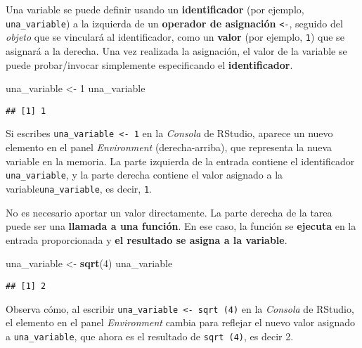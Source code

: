 \documentclass[
]{book}
\newenvironment{Shaded}{\begin{snugshade}}{\end{snugshade}}
\newcommand{\DecValTok}[1]{\textcolor[rgb]{0.00,0.00,0.81}{#1}}
\newcommand{\KeywordTok}[1]{\textcolor[rgb]{0.13,0.29,0.53}{\textbf{#1}}}
\newcommand{\NormalTok}[1]{#1}
\newcommand{\StringTok}[1]{\textcolor[rgb]{0.31,0.60,0.02}{#1}}
\begin{document}
Una variable se puede definir usando un \textbf{identificador} (por ejemplo, \texttt{una\_variable}) a la izquierda de un \textbf{operador de asignación} \texttt{\textless{}-}, seguido del \emph{objeto} que se vinculará al identificador, como un \textbf{valor} (por ejemplo, \texttt{1}) que se asignará a la derecha. Una vez realizada la asignación, el valor de la variable se puede probar/invocar simplemente especificando el \textbf{identificador}.

\begin{Shaded}
\begin{Highlighting}[]
\NormalTok{una_variable <-}\StringTok{ }\DecValTok{1}
\NormalTok{una_variable}
\end{Highlighting}
\end{Shaded}

\begin{verbatim}
## [1] 1
\end{verbatim}

Si escribes \texttt{una\_variable\ \textless{}-\ 1} en la \emph{Consola} de RStudio, aparece un nuevo elemento en el panel \emph{Environment} (derecha-arriba), que representa la nueva variable en la memoria. La parte izquierda de la entrada contiene el identificador \texttt{una\_variable}, y la parte derecha contiene el valor asignado a la variable\texttt{una\_variable}, es decir, \texttt{1}.

No es necesario aportar un valor directamente. La parte derecha de la tarea puede ser una \textbf{llamada a una función}. En ese caso, la función se \textbf{ejecuta} en la entrada proporcionada y \textbf{el resultado se asigna a la variable}.

\begin{Shaded}
\begin{Highlighting}[]
\NormalTok{una_variable <-}\StringTok{ }\KeywordTok{sqrt}\NormalTok{(}\DecValTok{4}\NormalTok{)}
\NormalTok{una_variable}
\end{Highlighting}
\end{Shaded}

\begin{verbatim}
## [1] 2
\end{verbatim}

Observa cómo, al escribir \texttt{una\_variable\ \textless{}-\ sqrt\ (4)} en la \emph{Consola} de RStudio, el elemento en el panel \emph{Environment} cambia para reflejar el nuevo valor asignado a \texttt{una\_variable}, que ahora es el resultado de \texttt{sqrt\ (4)}, es decir 2.
\end{document}
